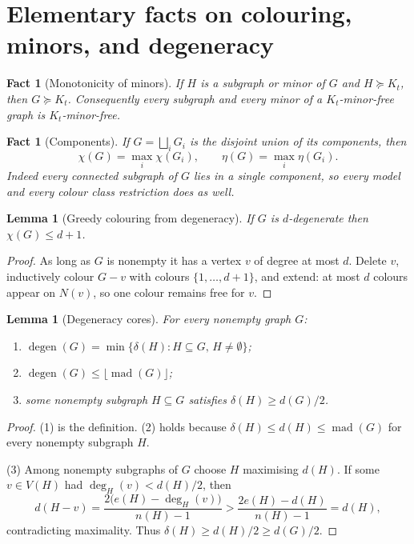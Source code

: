 \documentclass[11pt]{article}
\newtheorem{lemma}[theorem]{Lemma}
\newtheorem{fact}[theorem]{Fact}
\theoremstyle{definition}
\newcommand{\degen}{\operatorname{degen}}
\newcommand{\mad}{\operatorname{mad}}
\newcommand{\had}{\eta}
\begin{document}
\section{Elementary facts on colouring, minors, and degeneracy}

\begin{fact}[Monotonicity of minors]\label{fact:mono}
If \(H\) is a subgraph or minor of \(G\) and \(H\succcurlyeq K_t\), then
\(G\succcurlyeq K_t\). Consequently every subgraph and every minor of a
\(K_t\)-minor-free graph is \(K_t\)-minor-free.
\end{fact}

\begin{fact}[Components]\label{fact:comp}
If \(G=\bigsqcup_i G_i\) is the disjoint union of its components, then
\[
\chi(G)=\max_i\chi(G_i),\qquad \had(G)=\max_i\had(G_i).
\]
Indeed every connected subgraph of \(G\) lies in a single component, so every
model and every colour class restriction does as well.
\end{fact}

\begin{lemma}[Greedy colouring from degeneracy]\label{lem:greedy}
If \(G\) is \(d\)-degenerate then \(\chi(G)\le d+1\).
\end{lemma}

\begin{proof}
As long as \(G\) is nonempty it has a vertex \(v\) of degree at most \(d\).
Delete \(v\), inductively colour \(G-v\) with colours \(\{1,\dots,d+1\}\), and
extend: at most \(d\) colours appear on \(N(v)\), so one colour remains free for
\(v\).
\end{proof}

\begin{lemma}[Degeneracy cores]\label{lem:core}
For every nonempty graph \(G\):
\begin{enumerate}
\item \(\degen(G)=\min\{\delta(H):H\subseteq G,\,H\neq\emptyset\}\);
\item \(\degen(G)\le\lfloor\mad(G)\rfloor\);
\item some nonempty subgraph \(H\subseteq G\) satisfies \(\delta(H)\ge d(G)/2\).
\end{enumerate}
\end{lemma}

\begin{proof}
(1) is the definition. (2) holds because \(\delta(H)\le d(H)\le\mad(G)\) for
every nonempty subgraph \(H\).

(3) Among nonempty subgraphs of \(G\) choose \(H\) maximising \(d(H)\). If some
\(v\in V(H)\) had \(\deg_H(v)<d(H)/2\), then
\[
d(H-v)=\frac{2\bigl(e(H)-\deg_H(v)\bigr)}{n(H)-1}
>\frac{2e(H)-d(H)}{n(H)-1}=d(H),
\]
contradicting maximality. Thus \(\delta(H)\ge d(H)/2\ge d(G)/2\).
\end{proof}
\end{document}
